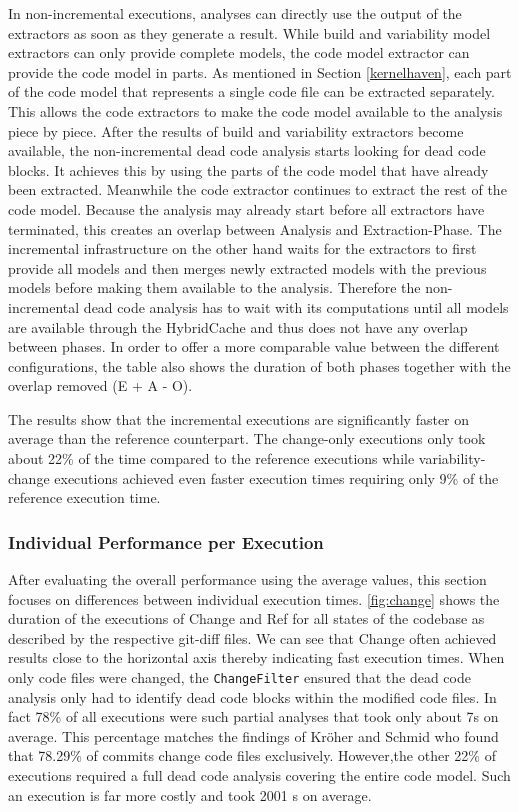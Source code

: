 \documentclass[a4paper]{article}
\begin{document}
In non-incremental executions, analyses can directly use the output of the extractors as soon as they generate a result. While build and variability model extractors can only provide complete models, the code model extractor can provide the code model in parts. As mentioned in Section \ref{kernelhaven}, each part of the code model that represents a single code file can be extracted separately. This allows the code extractors to make the code model available to the analysis piece by piece.
After the results of build and variability extractors become available, the non-incremental dead code analysis starts looking for dead code blocks. It achieves this by using the parts of the code model that  have already been extracted. Meanwhile the code extractor continues to extract the rest of the code model. Because the analysis may already start before all extractors have terminated, this creates an overlap between Analysis and Extraction-Phase. The incremental infrastructure on the other hand waits for the extractors to first provide all models and then merges newly extracted models with the previous models before making them available to the analysis. Therefore the non-incremental dead code analysis has to wait with its computations until all models are available through the HybridCache and thus does not have any overlap between phases. In order to offer a more comparable value between the different configurations, the table also shows the duration of both phases together with the overlap removed (E + A - O). 


The results show that the incremental executions are significantly faster on average than the reference counterpart. The change-only executions only took about 22\% of the time compared to the reference executions while variability-change executions achieved even faster execution times requiring only 9\% of the reference execution time.

\subsubsection{Individual Performance per Execution}\label{individual-performance}

After evaluating the overall performance using the average values, this section focuses on differences between individual execution times. \autoref{fig:change} shows the duration of the executions of \textcolor{orange!80!black}{Change} and \textcolor{gray!80!black}{Ref} for all states of the codebase as described by the respective git-diff files. We can see that Change often achieved results close to the horizontal axis thereby indicating fast execution times. When only code files were changed, the \texttt{ChangeFilter} ensured that the dead code analysis only had to identify dead code blocks within the modified code files. In fact 78\% of all executions were such partial analyses that took only about 7s on average. This percentage matches the findings of Kr\"oher and Schmid \cite{ComAn} who found that 78.29\% of commits change code files exclusively. However,the other 22\% of executions required a full dead code analysis covering the entire code model. Such an execution is far more costly and took 2001 s on average. 
\end{document}
